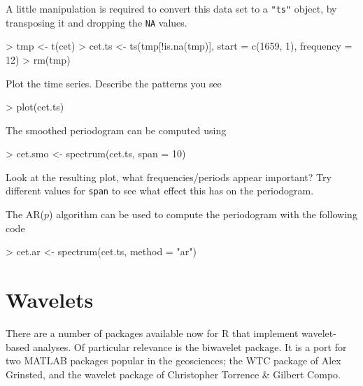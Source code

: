 \documentclass[a4paper,10pt]{article}
\begin{document}
A little manipulation is required to convert this data set to a \texttt{"ts"} object, by transposing it and dropping the \texttt{NA} values.

\begin{Schunk}
\begin{Sinput}
> tmp <- t(cet)
> cet.ts <- ts(tmp[!is.na(tmp)], start = c(1659, 1), frequency = 12)
> rm(tmp)
\end{Sinput}
\end{Schunk}

Plot the time series. Describe the patterns you see

\begin{Schunk}
\begin{Sinput}
> plot(cet.ts)
\end{Sinput}
\end{Schunk}

The smoothed periodogram can be computed using
\begin{Schunk}
\begin{Sinput}
> cet.smo <- spectrum(cet.ts, span = 10)
\end{Sinput}
\end{Schunk}
Look at the resulting plot, what frequencies/periods appear important? Try different values for \texttt{span} to see what effect this has on the periodogram.

The AR($p$) algorithm can be used to compute the periodogram with the following code
\begin{Schunk}
\begin{Sinput}
> cet.ar <- spectrum(cet.ts, method = "ar")
\end{Sinput}
\end{Schunk}

\section{Wavelets}
There are a number of packages available now for R that implement wavelet-based analyses. Of particular relevance is the \textsf{biwavelet} package. It is a port for two \textsf{MATLAB} packages popular in the geosciences; the \textsf{WTC} package of Alex Grinsted, and the \textsf{wavelet} package of Christopher Torrence \& Gilbert Compo.
\end{document}

